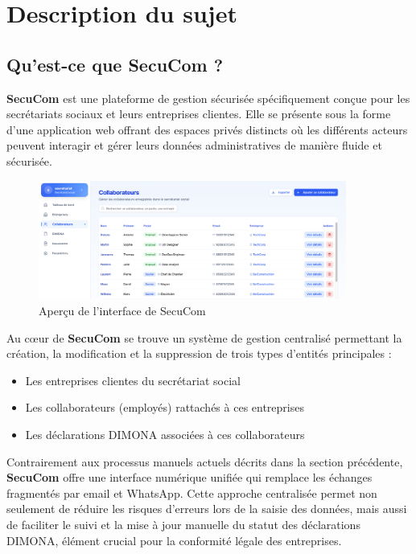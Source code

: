 \chapter{Description du sujet}

\section{Qu'est-ce que SecuCom ?}

\textbf{SecuCom} est une plateforme de gestion sécurisée spécifiquement conçue pour les secrétariats sociaux et leurs entreprises clientes. Elle se présente sous la forme d'une application web offrant des espaces privés distincts où les différents acteurs peuvent interagir et gérer leurs données administratives de manière fluide et sécurisée.

\begin{figure}[H]
    \centering
    \includegraphics[width=0.9\textwidth]{SecuComPreview.png}
    \caption{Aperçu de l'interface de SecuCom}
    \label{fig:secucomPreview}
\end{figure}

\noindent Au cœur de \textbf{SecuCom} se trouve un système de gestion centralisé permettant la création, la modification et la suppression de trois types d'entités principales :
\begin{itemize}[leftmargin=*,label=\textcolor{darkgray}{$\bullet$},itemsep=0.3em]
  \item Les entreprises clientes du secrétariat social
  \item Les collaborateurs (employés) rattachés à ces entreprises
  \item Les déclarations DIMONA associées à ces collaborateurs
\end{itemize}

\vspace{0.5cm}

\noindent Contrairement aux processus manuels actuels décrits dans la section précédente, \textbf{SecuCom} offre une interface numérique unifiée qui remplace les échanges fragmentés par email et WhatsApp. Cette approche centralisée permet non seulement de réduire les risques d'erreurs lors de la saisie des données, mais aussi de faciliter le suivi et la mise à jour manuelle du statut des déclarations DIMONA, élément crucial pour la conformité légale des entreprises.

